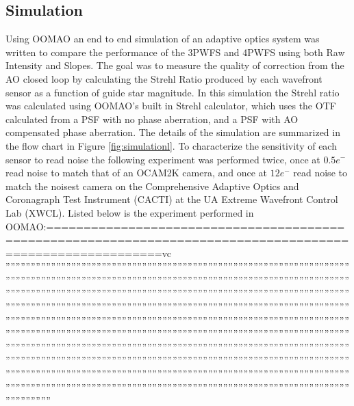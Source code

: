 \subsection{Simulation}

Using OOMAO an end to end simulation of an adaptive optics system was written to compare the performance of the 3PWFS and 4PWFS using both Raw Intensity and Slopes.  The goal was to measure the quality of correction from the AO closed loop by calculating the Strehl Ratio produced by each wavefront sensor as a function of guide star magnitude. In this simulation the Strehl ratio was calculated using OOMAO's built in Strehl calculator, which uses the OTF calculated from a PSF with no phase aberration, and a PSF with AO compensated phase aberration. The details of the simulation are summarized in the flow chart in Figure \ref{fig:simulationl}. To characterize the sensitivity of each sensor to read noise the following experiment was performed twice, once at $0.5e^-$ read noise to match that of an OCAM2K camera, and once at $12 e^-$ read noise to match the noisest camera on the Comprehensive Adaptive Optics and Coronagraph Test Instrument (CACTI) at the UA Extreme Wavefront Control Lab (XWCL). Listed below is the experiment performed in OOMAO:===========================================================================================================vc 
''''''''''''''''''''''''''''''''''''''''''''''''''''''''''''''''''''''''''''''''''''''''''''''''''''''''''''''''''''''''''''''''''''''''''''''''''''''''''''''''''''''''''''''''''''''''''''''''''''''''''''''''''''''''''''''''''''''''''''''''''''''''''''''''''''''''''''''''''''''''''''''''''''''''''''''''''''''''''''''''''''''''''''''''''''''''''''''''''''''''''''''''''''''''''''''''''''''''''''''''''''''''''''''''''''''''''''''''''''''''''''''''''''''''''''''''''''''''''''''''''''''''''''''''''''''''''''''''''''''''''''''''''''''''''''''''''''''''''''''''''''''''''''''''''''''''''''''''''''''''''''''''''''''''''''''''''''''''''''''''''''''''''''''''''''''''''''''''''''''''''''''''''''''''''''''''''''''''''''''''''''''''''''''''''''''''''''''''''''''''''''''''''''''''''''''''''''''''''''''''''''''''''''''''''''''''''''''''''''''''''''''''''''''''''''''''''''''''''''''''''''''''''''''''''''''''''''''''''''''''''''''''''''''''''''''''''''''''''''''''''''''''''''''''''''''''''''''''''''''''''''''''''''''''''''''''''''''''''''''''''''''''''''''''''''''''''''''''''''''''''''''''''''''''''''''''''''''''''''''''''''''''''''''''''''''''''''''''''''''''''''''''''''''''''''''''''''''''''''''''''''''''''''''''''''''''''''''''''''''''''''''''''''''''''''''''''''''''''''''''''''''''''''''''''''''''''''''''''''''''''''''''''''''''''''''''''''''''''''''''''''''''''''''''''

